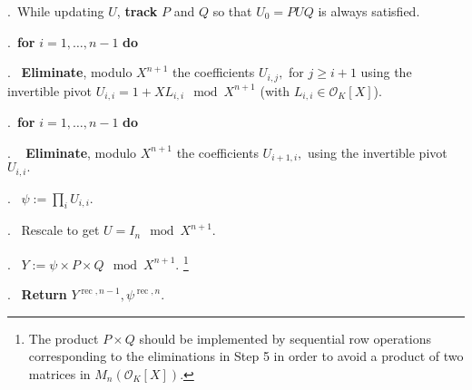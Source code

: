 \documentclass[sigconf]{acmart}
\DeclareMathOperator{\rec}{rec}
\newcommand{\OK}{\mathcal{O}_K}
\theoremstyle{definition}
\begin{document}
.\ While updating $U$, \textbf{track} $P$ and $Q$ so that $U_0=PUQ$ is always satisfied.

.\ {\bf for} $i=1,\dots,n-1$ {\bf do} 

.\  \:  \textbf{Eliminate}, modulo $X^{n+1}$ the coefficients $U_{i,j},$ for $j\geq i+1$ 
using the invertible pivot
$U_{i,i}=1+XL_{i,i} \mod X^{n+1}$ (with $L_{i,i} \in \OK[X]$). 

.\    {\bf for} $i=1,\dots,n-1$ {\bf do} 

. \  \:  \textbf{Eliminate}, modulo $X^{n+1}$ the coefficients $U_{i+1,i},$
using the invertible pivot $U_{i,i}.$

. \ $\psi:=\prod_i U_{i,i}.$

. \ Rescale to get $U = I_n \mod X^{n+1}.$

. \ $Y:=\psi \times P \times Q   \mod X^{n+1}.$ \footnote{The product $P \times Q$
should be implemented by sequential row operations corresponding to the eliminations in Step 5
in order to avoid a product of two matrices in $M_n(\OK[X])$.}

. \ \textbf{Return} $Y^{\rec,n-1}, \psi^{\rec,n}.$

\vspace{-1ex}\noindent\hrulefill

\medskip
\end{document}
